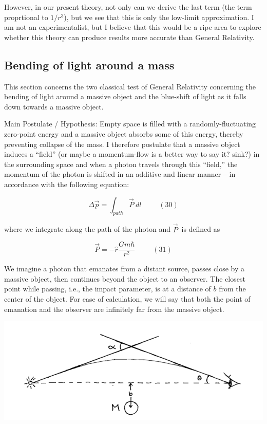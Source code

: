 \documentclass {article}
\begin{document}
However, in our present theory, not only can we derive the last term (the term proprtional to $1/r^3$), but we see that this is only the low-limit approximation. I am not an experimentalist, but I believe that this would be a ripe area to explore whether this theory can produce results more accurate than General Relativity.


\newpage
\subsection{Bending of light around a mass}
This section concerns the two classical test of General Relativity concerning the bending of light around a massive object and the blue-shift of light as it falls down towards a massive object.

Main Postulate / Hypothesis: Empty space is filled with a randomly-fluctuating zero-point energy and a massive object absorbs some of this energy, thereby preventing collapse of the mass. I therefore postulate that a massive object induces a “field” (or maybe a momentum-flow is a better way to say it? sink?) in the surrounding space and when a photon travels through this “field,” the momentum of the photon is shifted in an additive and linear manner – in accordance with the following equation: 

$$\Delta \vec p = \int_{path} \vec P ~ dl ~~~~~~~~~~~ (30)$$

where we integrate along the path of the photon and $\vec P$ is defined as

$$\vec P = - \hat r \frac {Gm\hbar}{r^2} ~~~~~~~~~~~ (31)$$

We imagine a photon that emanates from a distant source, passes close by a massive object, then continues beyond the object to an observer. The closest point while passing, i.e., the impact parameter, is at a distance of $b$ from the center of the object. For ease of calculation, we will say that both the point of emanation and the observer are infinitely far from the massive object.

\begin{center}
	\includegraphics[scale=0.4]{light-bending.png}
\end{center}
\end{document}
